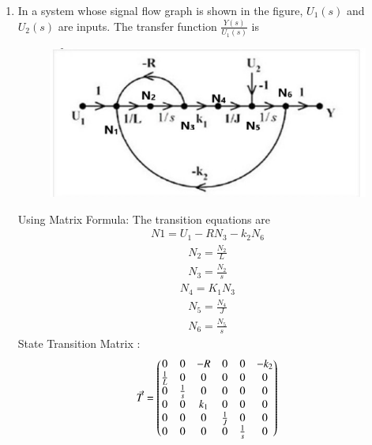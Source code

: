 \begin{enumerate}[label=\thesection.\arabic*.,ref=\thesection.\theenumi]
\item In a system whose signal flow graph is shown in the figure, $U_1(s)$ and $U_2(s)$ are inputs. The transfer function $\frac{Y(s)}{U_1(s)}$ is

\begin{figure}[!h]
  \includegraphics[width=\columnwidth]{picture1.eps}
\end{figure}







\solution 
Using Matrix Formula:
\newline
The transition equations are
\begin{align}
    N1 = U_1-RN_3-k_2N_6  
\end{align}
\begin{align}
    N_2=\frac{N_2}{L}
\end{align}
\begin{align}
    N_3=\frac{N_2}{s}
\end{align}
\begin{align}
    N_4=K_1N_3
\end{align}
\begin{align}
    N_5=\frac{N_4}{J}
\end{align}
\begin{align}
    N_6=\frac{N_5}{s}
\end{align}
State Transition Matrix :
\begin{align}
    \Vec{T} = \begin{pmatrix}0 & 0 & -R & 0 & 0 & -k_2\\
    \frac{1}{L} & 0 & 0 & 0 & 0 & 0\\
    0 & \frac{1}{s} & 0 & 0 & 0 & 0\\
    0 & 0 & k_1 & 0 & 0 & 0\\
    0 & 0 & 0 & \frac{1}{J} & 0 & 0\\
    0 & 0 & 0 & 0 & \frac{1}{s} & 0\end{pmatrix}
\end{align}    


\end{enumerate}
